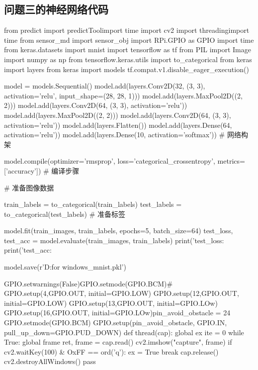 \documentclass{JXUSTmodeling}
\begin{document}
\begin{appendixx}
	\section{问题三的神经网络代码}
	from predict import predictToolimport time
	import cv2
	import threadingimport time
	from sensor_md import sensor_obj
	import RPi.GPIO as GPIO
	import time
	from keras.datasets import mnist
	import tensorflow as tf
	from PIL import Image
	import numpy as np
	from tensorflow.keras.utils import to_categorical
	from keras import layers
	from keras import models
	tf.compat.v1.disable_eager_execution()
	
	model = models.Sequential()
	model.add(layers.Conv2D(32, (3, 3), activation='relu', input_shape=(28, 28, 1)))
	model.add(layers.MaxPool2D((2, 2)))
	model.add(layers.Conv2D(64, (3, 3), activation='relu'))
	model.add(layers.MaxPool2D((2, 2)))
	model.add(layers.Conv2D(64, (3, 3), activation='relu'))
	model.add(layers.Flatten())
	model.add(layers.Dense(64, activation='relu'))
	model.add(layers.Dense(10, activation='softmax'))
	# 网络构架
	
	model.compile(optimizer='rmsprop', loss='categorical_crossentropy', metrics=['accuracy'])
	# 编译步骤
	
	# 准备图像数据
	
	train_labels = to_categorical(train_labels)
	test_labels = to_categorical(test_labels)
	# 准备标签
	
	model.fit(train_images, train_labels, epochs=5, batch_size=64)
	test_loss, test_acc = model.evaluate(train_images, train_labels)
	print('test_loss:%
	print('test_acc:%
	
	
	model.save(r'D:\Python for windows\homewor\cnn_mnist.pkl')
	
	GPIO.setwarnings(False)GPIO.setmode(GPIO.BCM)#
	GPIO.setup(4,GPIO.OUT, initial=GPIO.LOW)
	GPIO.setup(12,GPIO.OUT, initial=GPIO.LOW)
	GPIO.setup(13,GPIO.OUT, initial=GPIO.LOw)
	GPIO.setup(16,GPIO.OUT, initial=GPIO.LOw)pin_avoid_obstacle = 24
	GPIO.setmode(GPIO.BCM)
	GPIO.setup(pin_avoid_obstacle, GPIO.IN, pull_up_down=GPIO.PUD_DOWN)
	def thread(cap):
	global ex
	ite = 0
	while True:
	global frame
	ret, frame = cap.read()
	cv2.imshow("capture", frame)
	if cv2.waitKey(100) & OxFF == ord('q'):
	ex = True
	break
	cap.release()
	cv2.destroyAllWindows()
	pass
	

\end{appendixx}
\end{document}
